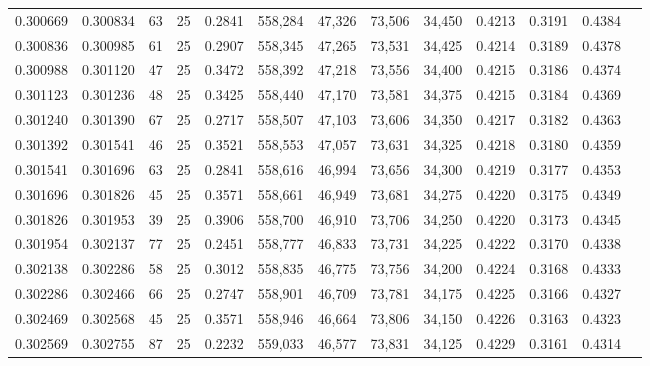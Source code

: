 \begin{tabular}{rrrrrrrrrrrrr}
0.300669 & 0.300834 &    63 &  25 &                                     0.2841 & 558,284 &  47,326 &  73,506 &  34,450 & 0.4213 & 0.3191 & 0.4384 \\
0.300836 & 0.300985 &    61 &  25 &                                     0.2907 & 558,345 &  47,265 &  73,531 &  34,425 & 0.4214 & 0.3189 & 0.4378 \\
0.300988 & 0.301120 &    47 &  25 &                                     0.3472 & 558,392 &  47,218 &  73,556 &  34,400 & 0.4215 & 0.3186 & 0.4374 \\
0.301123 & 0.301236 &    48 &  25 &                                     0.3425 & 558,440 &  47,170 &  73,581 &  34,375 & 0.4215 & 0.3184 & 0.4369 \\
0.301240 & 0.301390 &    67 &  25 &                                     0.2717 & 558,507 &  47,103 &  73,606 &  34,350 & 0.4217 & 0.3182 & 0.4363 \\
0.301392 & 0.301541 &    46 &  25 &                                     0.3521 & 558,553 &  47,057 &  73,631 &  34,325 & 0.4218 & 0.3180 & 0.4359 \\
0.301541 & 0.301696 &    63 &  25 &                                     0.2841 & 558,616 &  46,994 &  73,656 &  34,300 & 0.4219 & 0.3177 & 0.4353 \\
0.301696 & 0.301826 &    45 &  25 &                                     0.3571 & 558,661 &  46,949 &  73,681 &  34,275 & 0.4220 & 0.3175 & 0.4349 \\
0.301826 & 0.301953 &    39 &  25 &                                     0.3906 & 558,700 &  46,910 &  73,706 &  34,250 & 0.4220 & 0.3173 & 0.4345 \\
0.301954 & 0.302137 &    77 &  25 &                                     0.2451 & 558,777 &  46,833 &  73,731 &  34,225 & 0.4222 & 0.3170 & 0.4338 \\
0.302138 & 0.302286 &    58 &  25 &                                     0.3012 & 558,835 &  46,775 &  73,756 &  34,200 & 0.4224 & 0.3168 & 0.4333 \\
0.302286 & 0.302466 &    66 &  25 &                                     0.2747 & 558,901 &  46,709 &  73,781 &  34,175 & 0.4225 & 0.3166 & 0.4327 \\
0.302469 & 0.302568 &    45 &  25 &                                     0.3571 & 558,946 &  46,664 &  73,806 &  34,150 & 0.4226 & 0.3163 & 0.4323 \\
0.302569 & 0.302755 &    87 &  25 &                                     0.2232 & 559,033 &  46,577 &  73,831 &  34,125 & 0.4229 & 0.3161 & 0.4314 \\

\end{tabular}
